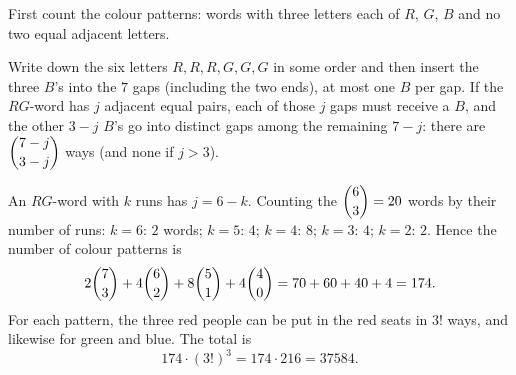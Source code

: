 First count the colour patterns: words with three letters each of $R$, $G$, $B$ and no two equal adjacent letters.

Write down the six letters $R,R,R,G,G,G$ in some order and then insert the three $B$'s into the $7$ gaps (including the two ends), at most one $B$ per gap. If the $RG$-word has $j$ adjacent equal pairs, each of those $j$ gaps must receive a $B$, and the other $3-j$ $B$'s go into distinct gaps among the remaining $7-j$: there are $\dbinom{7-j}{3-j}$ ways (and none if $j>3$).

An $RG$-word with $k$ runs has $j=6-k$. Counting the $\dbinom63=20$ words by their number of runs: $k=6$: $2$ words; $k=5$: $4$; $k=4$: $8$; $k=3$: $4$; $k=2$: $2$. Hence the number of colour patterns is
\[
2\dbinom73+4\dbinom62+8\dbinom51+4\dbinom40=70+60+40+4=174 .
\]
For each pattern, the three red people can be put in the red seats in $3!$ ways, and likewise for green and blue. The total is
\[
174\cdot(3!)^3=174\cdot216=\boxed{37584}.
\]
